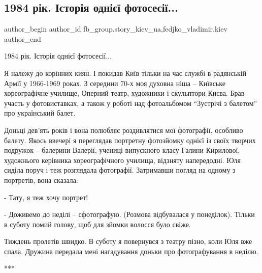  
 
 
 
 
 
\subsection{1984 рік. Історія однієї фотосесії...}
\label{sec:27_11_2021.fb.fb_group.story_kiev_ua.1.1984_fotosessia}
 
\ifcmt
 author_begin
   author_id fb_group.story_kiev_ua,fedjko_vladimir.kiev
 author_end
\fi

1984 рік. Історія однієї фотосесії...

Я належу до корінних киян. І покидав Київ тільки на час службі в радянській
Армії у 1966-1969 роках. З середини 70-х моя духовна ніша – Київське
хореографічне училище, Оперний театр, художники і скульптори Києва. Брав участь
у фотовиставках, а також у роботі над фотоальбомом \enquote{Зустрічі з балетом} про
український балет.


Доньці дев’ять років і вона полюбляє роздивлятися мої фотографії, особливо
балету. Якось ввечері я переглядав портретну фотозйомку однієї із своїх творчих
подружок – балерини Валерії, учениці випускного класу Галини Кирилової,
художнього керівника хореографічного училища, відзняту напередодні. Юля сиділа
поруч і теж розглядала фотографії. Затримавши погляд на одному з портретів,
вона сказала:

- Тату, я теж хочу портрет!

- Доживемо до неділі – сфотографую. (Розмова відбувалася у понеділок). Тільки в
суботу помий голову, щоб для зйомки волосся було свіже.

Тиждень пролетів швидко. В суботу я повернувся з театру пізно, коли Юля вже
спала. Дружина передала мені нагадування доньки про фотографування в неділю.


***


